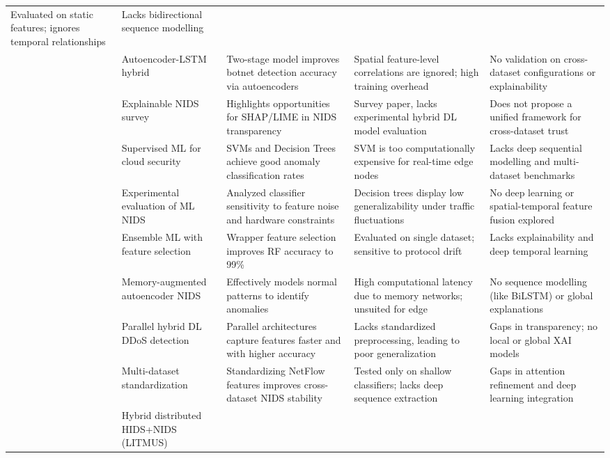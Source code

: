 \documentclass[a4paper,fleqn]{cas-sc}
\begin{document}
{\begin{landscape}
\begin{longtable}{p{4cm}p{4cm}p{4cm}p{4cm}p{4cm}}
  Evaluated on static features; ignores temporal relationships &
  Lacks bidirectional sequence modelling \\
\cite{dong2021novel} &
  Autoencoder-LSTM hybrid &
  Two-stage model improves botnet detection accuracy via autoencoders &
  Spatial feature-level correlations are ignored; high training overhead &
  No validation on cross-dataset configurations or explainability \\
\cite{liu2022explainable} &
  Explainable NIDS survey &
  Highlights opportunities for SHAP/LIME in NIDS transparency &
  Survey paper, lacks experimental hybrid DL model evaluation &
  Does not propose a unified framework for cross-dataset trust \\
\cite{bhamare2020machine} &
  Supervised ML for cloud security &
  SVMs and Decision Trees achieve good anomaly classification rates &
  SVM is too computationally expensive for real-time edge nodes &
  Lacks deep sequential modelling and multi-dataset benchmarks \\
\cite{churcher2021machine} &
  Experimental evaluation of ML NIDS &
  Analyzed classifier sensitivity to feature noise and hardware constraints &
  Decision trees display low generalizability under traffic fluctuations &
  No deep learning or spatial-temporal feature fusion explored \\
\cite{soe2020machine} &
  Ensemble ML with feature selection &
  Wrapper feature selection improves RF accuracy to 99\% &
  Evaluated on single dataset; sensitive to protocol drift &
  Lacks explainability and deep temporal learning \\
\cite{abbasi2021deep} &
  Memory-augmented autoencoder NIDS &
  Effectively models normal patterns to identify anomalies &
  High computational latency due to memory networks; unsuited for edge &
  No sequence modelling (like BiLSTM) or global explanations \\
\cite{alomari2021hybrid} &
  Parallel hybrid DL DDoS detection &
  Parallel architectures capture features faster and with higher accuracy &
  Lacks standardized preprocessing, leading to poor generalization &
  Gaps in transparency; no local or global XAI models \\
\cite{habib2023multi} &
  Multi-dataset standardization &
  Standardizing NetFlow features improves cross-dataset NIDS stability &
  Tested only on shallow classifiers; lacks deep sequence extraction &
  Gaps in attention refinement and deep learning integration \\
\cite{sanyal2026litmus} &
  Hybrid distributed HIDS+NIDS (LITMUS) &

\end{longtable}
\end{landscape}}
\end{document}
